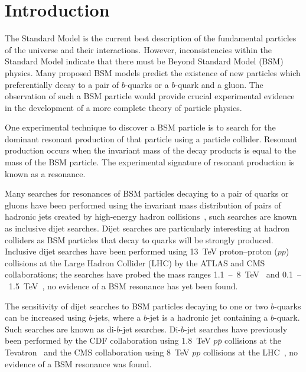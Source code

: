 \chapter{Introduction}
\label{sec:int}
The Standard Model is the current best description of the fundamental particles of the universe and their interactions.
However, inconsistencies within the Standard Model indicate that
there must be Beyond Standard Model (BSM) physics.
Many proposed BSM models predict the existence of new particles
which preferentially decay to a pair of $b$-quarks or a $b$-quark and a gluon.
The observation of such a BSM particle would provide crucial experimental
evidence in the development of a more complete theory of particle physics.


One experimental technique to discover a BSM particle is to search for
the dominant resonant production of that particle using a particle collider.
Resonant production occurs when the invariant mass of the decay products is equal to the mass of the BSM particle.
The experimental signature of resonant production is known as a resonance.

Many searches for resonances of BSM particles decaying to a pair of quarks or gluons
have been performed using the invariant mass distribution of pairs of hadronic jets created
by high-energy hadron collisions~\cite{theo-dijet_harris}, such searches are known as inclusive dijet searches.
Dijet searches are particularly interesting at hadron colliders as BSM particles
that decay to quarks will be strongly produced.
Inclusive dijet searches have been performed using 13~TeV \mbox{proton--proton} ($pp$) collisions at the
Large Hadron Collider (LHC) by the ATLAS and CMS collaborations;
the searches have probed the mass ranges 1.1~--~8~TeV~\cite{dijet-mori16_paper,dijet-mori17_paper,dijet-cms}
and 0.1~--~1.5~TeV~\cite{dijet-isr,dijet-TLA,dijet-isr_cms},
no evidence of a BSM resonance has yet been found.

The sensitivity of dijet searches to BSM particles decaying to one or two $b$-quarks can be increased
using $b$-jets, where a $b$-jet is a hadronic jet containing a $b$-quark.
Such searches are known as di-$b$-jet searches.
Di-$b$-jet searches have previously been performed by
the CDF collaboration using 1.8~TeV $p\bar{p}$ collisions at the Tevatron~\cite{dibjet-cdf}
and the CMS collaboration using 8~TeV $pp$ collisions at the LHC~\cite{dibjet-cms},
no evidence of a BSM resonance was found.

